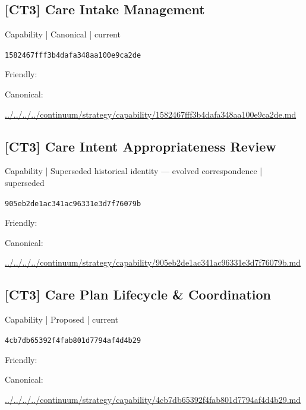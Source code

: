 \documentclass[10pt,a4paper]{article}
\begin{document}
\subsection*{[CT3] Care Intake Management}
{\small Capability | Canonical | current}\par
\texttt{1582467fff3b4dafa348aa100e9ca2de}\par
Friendly: \par
Canonical: \par
{\footnotesize\url{../../../../continuum/strategy/capability/1582467fff3b4dafa348aa100e9ca2de.md}}\par
\subsection*{[CT3] Care Intent Appropriateness Review}
{\small Capability | Superseded historical identity — evolved correspondence | superseded}\par
\texttt{905eb2de1ac341ac96331e3d7f76079b}\par
Friendly: \par
Canonical: \par
{\footnotesize\url{../../../../continuum/strategy/capability/905eb2de1ac341ac96331e3d7f76079b.md}}\par
\subsection*{[CT3] Care Plan Lifecycle \& Coordination}
{\small Capability | Proposed | current}\par
\texttt{4cb7db65392f4fab801d7794af4d4b29}\par
Friendly: \par
Canonical: \par
{\footnotesize\url{../../../../continuum/strategy/capability/4cb7db65392f4fab801d7794af4d4b29.md}}\par
\end{document}
